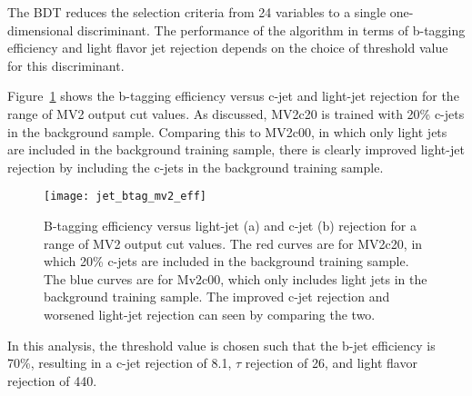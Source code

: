 The BDT reduces the selection criteria from 24 variables to a single one-dimensional discriminant.
The performance of the algorithm in terms of b-tagging efficiency and light flavor jet rejection depends on the
choice of threshold value for this discriminant.

Figure~\ref{fig:jet_btag_mv2_eff} shows the b-tagging efficiency versus c-jet and light-jet rejection
for the range of MV2 output cut values.
As discussed, MV2c20 is trained with 20\% c-jets in the background sample.
Comparing this to MV2c00, in which only light jets are included in the background training sample,
there is clearly improved light-jet rejection by including the c-jets in the background training sample.

\begin{figure}[!ht]
    \centering
\texttt{[image: jet\_btag\_mv2\_eff]}
\caption{B-tagging efficiency versus light-jet (a) and c-jet (b) rejection for a range of MV2 output cut values.
The red curves are for MV2c20, in which 20\% c-jets are included in the background training sample.
The blue curves are for Mv2c00, which only includes light jets in the background training sample.
The improved c-jet rejection and worsened light-jet rejection can seen by comparing the two.
}
\label{fig:jet_btag_mv2_eff}
\end{figure}\cite{jet-btag-mv2}

In this analysis, the threshold value is chosen such that the b-jet efficiency is 70\%, resulting
in a c-jet rejection of 8.1, $\tau$ rejection of 26, and light flavor rejection of 440.\cite{jet-btag-mv2}